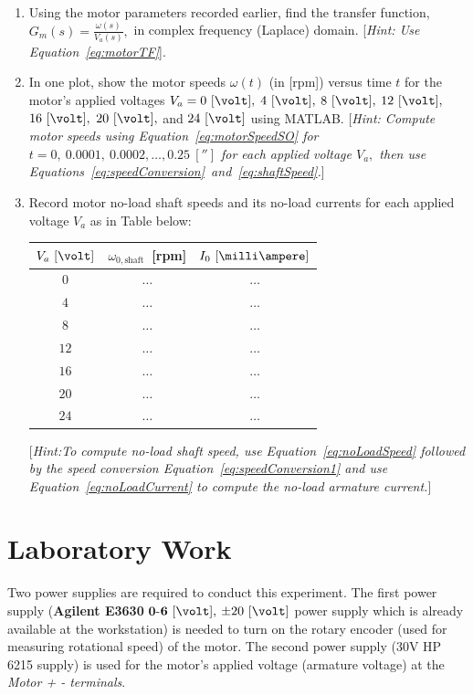 \begin{prelab}
~  
  \begin{enumerate}
\item  Using the motor parameters recorded earlier, find the transfer function, $G_m(s) = \frac{\omega(s)}{V_a(s)},$ in complex frequency (Laplace) domain. [{\it Hint: Use Equation~\eqref{eq:motorTF}}].    
\item In one plot, show the motor speeds $\omega(t)$ (in [rpm]) versus time $t$ for the motor's applied voltages $V_a=0~[\volt],$ $4~[\volt],$ $8~[\volt],$ $12~[\volt],$ $16~[\volt],$ $20~[\volt],$ and $24~[\volt]$ using MATLAB.  [{\it Hint: Compute motor speeds using Equation~\eqref{eq:motorSpeedSO} for $t=0,~0.0001,~0.0002,\ldots, 0.25~[\second]$ for each applied voltage $V_a,$ then use Equations~\eqref{eq:speedConversion}~and~\eqref{eq:shaftSpeed}.}]

\item Record motor no-load shaft speeds and its no-load currents  for each applied voltage $V_a$ as in Table below: %
%
  \begin{center}
    \begin{tabular}{c|c|c}
      \toprule
      $V_a~[\volt]$ &  $\omega_{0,\mathrm{shaft}}$~[rpm] & $I_0~[\milli\ampere]$\\
      \toprule
      $0$ & $\ldots$ & $\ldots$\\
      $4$ & $\ldots$ & $\ldots$\\
      $8$ & $\ldots$ & $\ldots$\\
      $12$ & $\ldots$ & $\ldots$\\
      $16$ & $\ldots$ & $\ldots$\\
      $20$ & $\ldots$ & $\ldots$\\
      $24$ & $\ldots$ & $\ldots$\\
      \bottomrule
    \end{tabular}    
  \end{center}
%
[\emph{Hint:To compute no-load shaft speed, use Equation~\eqref{eq:noLoadSpeed} followed by the speed conversion Equation~\eqref{eq:speedConversion1} and use Equation~\eqref{eq:noLoadCurrent}  to compute the no-load armature current.}]
\end{enumerate}
\end{prelab}




\section{Laboratory Work}
Two power supplies are required to conduct this experiment. The first power supply ({\bf Agilent E3630} $\mathbf{0}$-$\mathbf{6}~[\volt],$ $\pm 20~[\volt]$ power supply which is already available at the workstation) is needed to turn on the rotary encoder (used for measuring rotational speed) of the motor. The second power supply ($30$V HP 6215 supply) is used for the motor's applied voltage (armature voltage) at the \emph{Motor + - terminals}.

